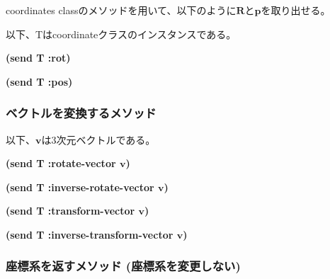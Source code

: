 coordinates classのメソッドを用いて、以下のように$\mathbf{R}$と$\mathbf{p}$を取り出せる。

以下、Tはcoordinateクラスのインスタンスである。

\begin{refdesc}

{\bf (send T :rot)}

{\bf (send T :pos)}

\end{refdesc}

\subsubsection*{ベクトルを変換するメソッド}

以下、$\mathbf{v}$は3次元ベクトルである。

\begin{refdesc}

{\bf (send T :rotate-vector $\mathbf{v}$)}

{\bf (send T :inverse-rotate-vector $\mathbf{v}$)}

{\bf (send T :transform-vector $\mathbf{v}$)}

{\bf (send T :inverse-transform-vector $\mathbf{v}$)}

\end{refdesc}

\subsubsection*{座標系を返すメソッド (座標系を変更しない)}

